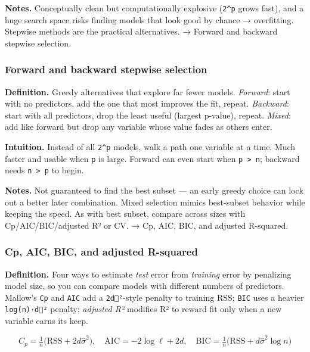 \documentclass[
  10pt,
  letterpaper,
  onecolumn]{article}
\begin{document}
\textbf{Notes.} Conceptually clean but computationally explosive
(\texttt{2\^{}p} grows fast), and a huge search space risks finding
models that look good by chance → overfitting. Stepwise methods are the
practical alternatives. → Forward and backward stepwise selection.

\hypertarget{forward-and-backward-stepwise-selection}{%
\subsubsection{Forward and backward stepwise
selection}\label{forward-and-backward-stepwise-selection}}

\textbf{Definition.} Greedy alternatives that explore far fewer models.
\emph{Forward}: start with no predictors, add the one that most improves
the fit, repeat. \emph{Backward}: start with all predictors, drop the
least useful (largest p-value), repeat. \emph{Mixed}: add like forward
but drop any variable whose value fades as others enter.

\textbf{Intuition.} Instead of all \texttt{2\^{}p} models, walk a path
one variable at a time. Much faster and usable when \texttt{p} is large.
Forward can even start when \texttt{p\ \textgreater{}\ n}; backward
needs \texttt{n\ \textgreater{}\ p} to begin.

\textbf{Notes.} Not guaranteed to find the best subset --- an early
greedy choice can lock out a better later combination. Mixed selection
mimics best-subset behavior while keeping the speed. As with best
subset, compare across sizes with Cp/AIC/BIC/adjusted R² or CV. → Cp,
AIC, BIC, and adjusted R-squared.

\hypertarget{cp-aic-bic-and-adjusted-r-squared}{%
\subsubsection{Cp, AIC, BIC, and adjusted
R-squared}\label{cp-aic-bic-and-adjusted-r-squared}}

\textbf{Definition.} Four ways to estimate \emph{test} error from
\emph{training} error by penalizing model size, so you can compare
models with different numbers of predictors. Mallow's \texttt{Cp} and
\texttt{AIC} add a \texttt{2d²}-style penalty to training RSS;
\texttt{BIC} uses a heavier \texttt{log(n)·d²} penalty; \emph{adjusted
R²} modifies R² to reward fit only when a new variable earns its keep.

\begin{equation*}
C_p=\tfrac{1}{n}\bigl(\mathrm{RSS}+2d\hat\sigma^2\bigr),\quad
\mathrm{AIC}=-2\log\ell+2d,\quad
\mathrm{BIC}=\tfrac{1}{n}\bigl(\mathrm{RSS}+d\hat\sigma^2\log n\bigr)
\end{equation*}
\end{document}
